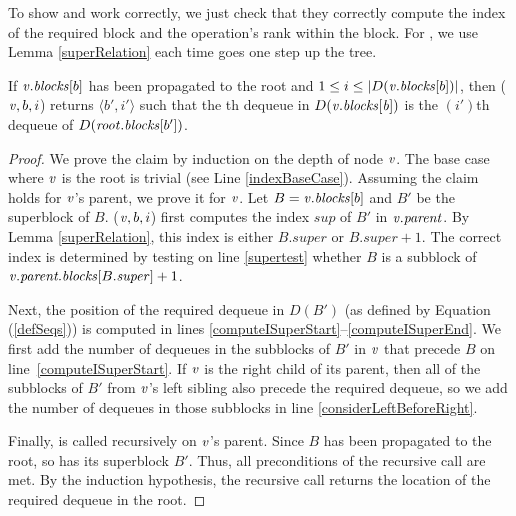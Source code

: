 To show   and  work correctly, we  just  check that they correctly compute the index of the required block
and the operation's rank within the block.  
For , we use Lemma \ref{superRelation} each time  goes one step up the tree.

\begin{lemma}\label{lem::indexDequeue}
If $\mbox{\textnormal{\textit{v}}}.\mbox{\textit{blocks}}[b]$ has been propagated to the root and $1\leq i\leq |D(\mbox{\textnormal{\textit{v}}}.\mbox{\textit{blocks}}[b])|$, 
 then ($\mbox{\textnormal{\textit{v}}}, b, i$) returns $\langle b',i' \rangle$ such that the th dequeue in $D(\mbox{\textnormal{\textit{v}}}.\mbox{\textit{blocks}}[\mbox{\textnormal{\textit{b}}}])$ is the $(i')$th dequeue of $D(\mbox{\textnormal{\textit{root}}}.\mbox{\textit{blocks}}[b'])$.
\end{lemma}

\begin{proof}
We prove the claim by induction on the depth of node $\mbox{\textnormal{\textit{v}}}$. The base case where $\mbox{\textnormal{\textit{v}}}$ is the root is trivial (see Line \ref{indexBaseCase}).
Assuming the claim holds for $\mbox{\textnormal{\textit{v}}}$'s parent, we prove it for $\mbox{\textnormal{\textit{v}}}$.
Let $B=\mbox{\textnormal{\textit{v}}}.\mbox{\textit{blocks}}[b]$ and $B'$ be the superblock of $B$.
($\mbox{\textnormal{\textit{v}}}, b, i$) first computes the index $sup$ of $B'$ in $\mbox{\textnormal{\textit{v}}}.\mbox{\textit{parent}}$.
By Lemma \ref{superRelation}, this index is either $B.super$ or $B.super+1$.
The correct index is determined by testing on line \ref{supertest} whether $B$ is a subblock of $\mbox{\textnormal{\textit{v}}}.\mbox{\textit{parent.blocks}}[B.\mbox{\textit{super}}]+1$.

Next, the position of the required dequeue in $D(B')$ (as defined by Equation (\ref{defSeqs})) is computed in 
lines \ref{computeISuperStart}--\ref{computeISuperEnd}. 
We first add the number of dequeues in the subblocks of $B'$ in $\mbox{\textnormal{\textit{v}}}$ that precede $B$ on line~\ref{computeISuperStart}.
If $\mbox{\textnormal{\textit{v}}}$ is the right child of its parent, then all of the subblocks of $B'$ from $\mbox{\textnormal{\textit{v}}}$'s left sibling
also precede the required dequeue, so we add the number of dequeues in those subblocks in line \ref{considerLeftBeforeRight}.

Finally,  is called recursively on $\mbox{\textnormal{\textit{v}}}$'s parent.
Since $B$ has been propagated to the root, so has its superblock $B'$.
Thus, all preconditions of the recursive call are met.
By the induction hypothesis, the recursive call returns the location of the required dequeue in the root.\end{proof}


